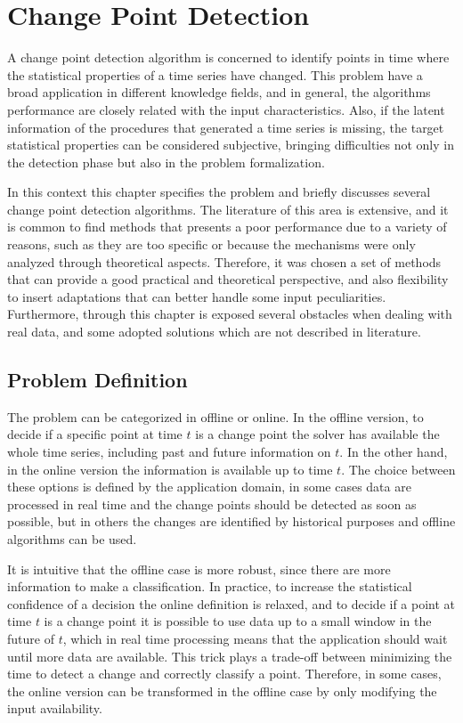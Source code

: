 \chapter{Change Point Detection} 

A change point detection algorithm is concerned to identify points in time where the statistical properties of a time series have changed. This problem have a broad application in different knowledge fields, and in general, the algorithms performance are closely related with the input characteristics. Also, if the latent information of the procedures that generated a time series is missing, the target statistical properties can be considered subjective, bringing difficulties not only in the detection phase but also in the problem formalization.

In this context this chapter specifies the problem and briefly discusses several change point detection algorithms. The literature of this area is extensive, and it is common to find methods that presents a poor performance due to a variety of reasons, such as they are too specific or because the mechanisms were only analyzed through theoretical aspects. Therefore, it was chosen a set of methods that can provide a good practical and theoretical perspective, and also flexibility to insert adaptations that can better handle some input peculiarities. Furthermore, through this chapter is exposed several obstacles when dealing with real data, and some adopted solutions which are not described in literature.

\section{Problem Definition}

The problem can be categorized in offline or online. In the offline version, to decide if a specific point at time $t$ is a change point the solver has available the whole time series, including past and future information on $t$. In the other hand, in the online version the information is available up to time $t$. The choice between these options is defined by the application domain, in some cases data are processed in real time and the change points should be detected as soon as possible, but in others the changes are identified by historical purposes and offline algorithms can be used. 

It is intuitive that the offline case is more robust, since there are more information to make a classification. In practice, to increase the statistical confidence of a decision the online definition is relaxed, and to decide if a point at time $t$ is a change point it is possible to use data up to a small window in the future of $t$, which in real time processing means that the application should wait until more data are available. This trick plays a trade-off between minimizing the time to detect a change and correctly classify a point. Therefore, in some cases, the online version can be transformed in the offline case by only modifying the input availability. 

